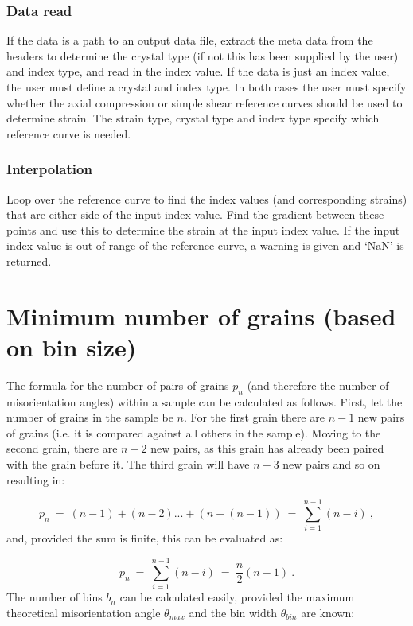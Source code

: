 \documentclass[a4paper,12pt,twoside]{report}
\numberwithin{equation}{chapter}
\begin{document}
\subsubsection{Data read}
If the data is a path to an output data file, extract the meta data from the headers to determine the crystal type (if not this has been supplied by the user) and index type, and read in the index value. If the data is just an index value, the user must define a crystal and index type. In both cases the user must specify whether the axial compression or simple shear reference curves should be used to determine strain. The strain type, crystal type and index type specify which reference curve is needed.

\subsubsection{Interpolation}
Loop over the reference curve to find the index values (and corresponding strains) that are either side of the input index value. Find the gradient between these points and use this to determine the strain at the input index value. If the input index value is out of range of the reference curve, a warning is given and \lq{}NaN\rq{} is returned.


\section{Minimum number of grains (based on bin size)} \label{App:min_no_grains}
The formula for the number of pairs of grains $p_n$ (and therefore the number of misorientation angles) within a sample can be calculated as follows. First, let the number of grains in the sample be $n$. For the first grain there are $n - 1$ new pairs of grains (i.e. it is compared against all others in the sample). Moving to the second grain, there are $n - 2$ new pairs, as this grain has already been paired with the grain before it. The third grain will have $n - 3$ new pairs and so on resulting in:

\begin{equation}
p_n\ =\ (n-1) + (n-2) ... + (n - (n-1))\ =\ \sum_{i=1}^{n-1} (n - i)\ ,
\end{equation}   
\noindent
and, provided the sum is finite, this can be evaluated as:

\begin{equation}
p_n\ =\ \sum^{n-1}_{i=1}(n - i)\ =\ \frac{n}{2}(n-1)\ .
\end{equation}
\noindent
The number of bins $b_n$ can be calculated easily, provided the maximum theoretical misorientation angle $\theta_{max}$ and the bin width $\theta_{bin}$ are known:
\end{document}
